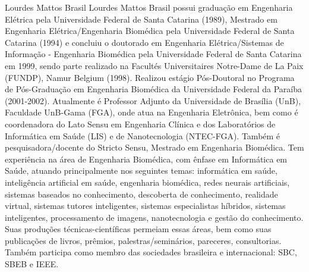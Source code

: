 \documentclass[journal]{IEEEtran}
\begin{document}
\begin{IEEEbiography}{Lourdes Mattos Brasil}
Lourdes Mattos Brasil possui graduação em Engenharia Elétrica pela Universidade Federal de Santa Catarina (1989), 
Mestrado em Engenharia Elétrica/Engenharia Biomédica pela Universidade Federal de Santa Catarina (1994) e 
concluiu o doutorado em Engenharia Elétrica/Sistemas de Informação - Engenharia Biomédica pela Universidade Federal de Santa Catarina em 1999, 
sendo parte realizado na Facultés Universitaires Notre-Dame de La Paix (FUNDP), Namur  Belgium (1998). 
Realizou estágio Pós-Doutoral no Programa de Pós-Graduação em Engenharia Biomédica da Universidade Federal da Paraíba (2001-2002). 
Atualmente é Professor Adjunto da Universidade de Brasília (UnB), 
Faculdade UnB-Gama (FGA), onde atua na Engenharia Eletrônica, 
bem como é coordenadora do Lato Sensu em Engenharia Clínica e dos Laboratórios de Informática em Saúde (LIS) e de Nanotecnologia (NTEC-FGA). 
Também é pesquisadora/docente do Stricto Sensu, Mestrado em Engenharia Biomédica. 
Tem experiência na área de Engenharia Biomédica, com ênfase em Informática em Saúde, atuando principalmente nos seguintes temas: 
informática em saúde, inteligência artificial em saúde, engenharia biomédica, redes neurais artificiais, sistemas baseados no conhecimento, descoberta de conhecimento, realidade virtual, sistemas tutores inteligentes, sistemas especialistas híbridos, sistemas inteligentes, processamento de imagens, nanotecnologia e gestão do conhecimento. 
Suas produções técnicas-científicas permeiam essas áreas, bem como suas publicações de livros, prêmios, palestras/seminários, pareceres, consultorias. 
Também participa como membro das sociedades brasileira e internacional: SBC, SBEB e IEEE.
\end{IEEEbiography}




\end{document}

